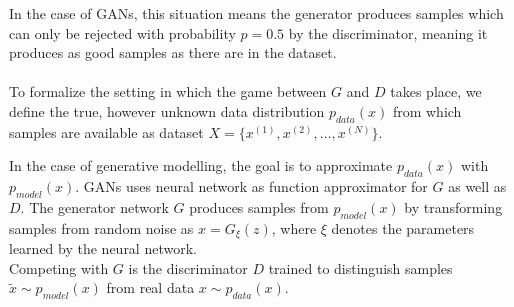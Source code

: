 In the case of GANs, this situation means the generator produces samples which can only be rejected with probability $p=0.5$ by the discriminator, meaning it produces as good samples as there are in the dataset.\\\\

To formalize the setting in which the game between $G$ and $D$ takes place, we define the true, however unknown data distribution $p_{data}(x)$ from which samples are available as dataset $X=\{x^{(1)}, x^{(2)}, \dots, x^{(N)}\}$.

In the case of generative modelling, the goal is to approximate $p_{data}(x)$ with $p_{model}(x)$.
GANs uses neural network as function approximator for $G$ as well as $D$.
The generator network $G$ produces samples from $p_{model}(x)$ by transforming samples from random noise as $x = G_\xi(z)$,
where $\xi$ denotes the parameters learned by the neural network.\\
Competing with $G$ is the discriminator $D$ trained to distinguish samples $ \tilde{x} \sim p_{model}(x)$ from real data $x \sim p_{data}(x)$.









